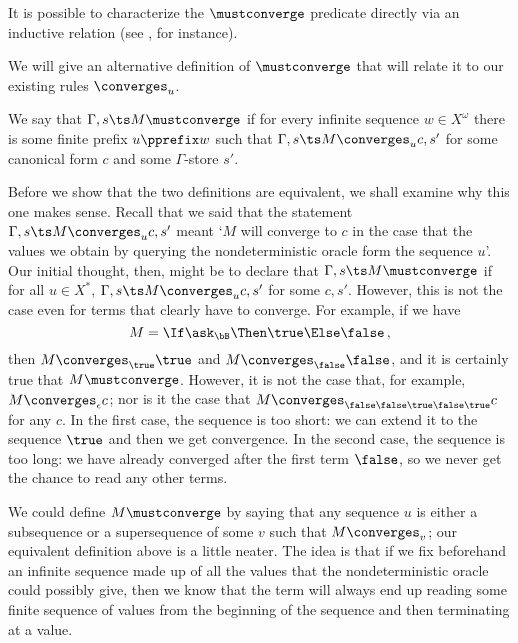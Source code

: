\begin{remark}
It is possible to characterize the $\mustconverge$ predicate directly via an inductive relation (see \cite{RusssThesis}, for instance).  
\end{remark}

We will give an alternative definition of $\mustconverge$ that will relate it to our existing rules $\converges_u$.

\begin{definition}
  We say that $\Gamma,s\ts M\mustconverge$ if for every infinite sequence $w\in X^\omega$ there is some finite prefix $u\pprefix w$ such that $\Gamma,s\ts M\converges_u c,s'$ for some canonical form $c$ and some $\Gamma$-store $s'$.
  \label{DefMustConvergence}
\end{definition}

Before we show that the two definitions are equivalent, we shall examine why this one makes sense.  
Recall that we said that the statement $\Gamma,s\ts M\converges_u c,s'$ meant `$M$ will converge to $c$ in the case that the values we obtain by querying the nondeterministic oracle form the sequence $u$'.  
Our initial thought, then, might be to declare that $\Gamma,s\ts M\mustconverge$ if for all $u\in X^*$, $\Gamma,s\ts M\converges_u c,s'$ for some $c,s'$.  
However, this is not the case even for terms that clearly have to converge.
For example, if we have
\[
  M = \If \ask_\bB \Then \true \Else \false\,,
  \]
then $M\converges_\true \true$ and $M\converges_\false \false$, and it is certainly true that $M\mustconverge$.
However, it is not the case that, for example, $M\converges_\epsilon c$; nor is it the case that $M\converges_{\false\false\true\false\true}c$ for any $c$.
In the first case, the sequence is too short: we can extend it to the sequence $\true$ and then we get convergence.  
In the second case, the sequence is too long: we have already converged after the first term $\false$, so we never get the chance to read any other terms.

We could define $M\mustconverge$ by saying that any sequence $u$ is either a subsequence or a supersequence of some $v$ such that $M\converges_v$; our equivalent definition above is a little neater.  
The idea is that if we fix beforehand an infinite sequence made up of all the values that the nondeterministic oracle could possibly give, then we know that the term will always end up reading some finite sequence of values from the beginning of the sequence and then terminating at a value.

